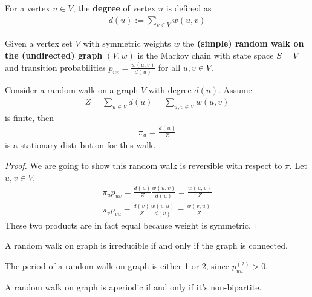 \documentclass{article}
\begin{document}
	\begin{definition}
		For a vertex $u \in V$, the \textbf{degree} of vertex $u$ is defined as
		\begin{align}
			d(u) := \sum_{v \in V} w(u, v)
		\end{align}
	\end{definition}
	
	\begin{definition}
		Given a vertex set $V$ with symmetric weights $w$ the \textbf{(simple) random walk on the (undirected) graph} $(V, w)$ is the Markov chain with state space $S=V$ and transition probabilities $p_{u v}=\frac{w(u, v)}{d(u)}$ for all $u, v \in V$.
	\end{definition}
	
	\begin{definition}
		Consider a random walk on a graph $V$ with degree $d(u)$. Assume 
		\begin{align}
			Z = \sum_{u \in V}d(u) = \sum_{u, v \in V} w(u, v)	
		\end{align}
		is finite, then
		\begin{align}
			\pi_u = \frac{d(u)}{Z}
		\end{align}
		is a stationary distribution for this walk.
	\end{definition}
	\begin{proof}
		We are going to show this random walk is reversible with respect to $\pi$. Let $u, v \in V$,
		\begin{align}
			\pi_u p_{uv} = \frac{d(u)}{Z} \frac{w(u, v)}{d(u)} = \frac{w(u,v)}{Z} \\
			\pi_v p_{vu} = \frac{d(v)}{Z} \frac{w(v, u)}{d(v)} = \frac{w(v,u)}{Z}
		\end{align}
		These two products are in fact equal because weight is symmetric.
	\end{proof}
	
	\begin{proposition}
		A random walk on graph is irreducible if and only if the graph is connected.
	\end{proposition}
	
	\begin{proposition}
		The period of a random walk on graph is either 1 or 2, since $p^{(2)}_{uu} > 0$.
	\end{proposition}
	
	\begin{proposition}
		A random walk on graph is aperiodic if and only if it's non-bipartite.
	\end{proposition}
	
\end{document}
